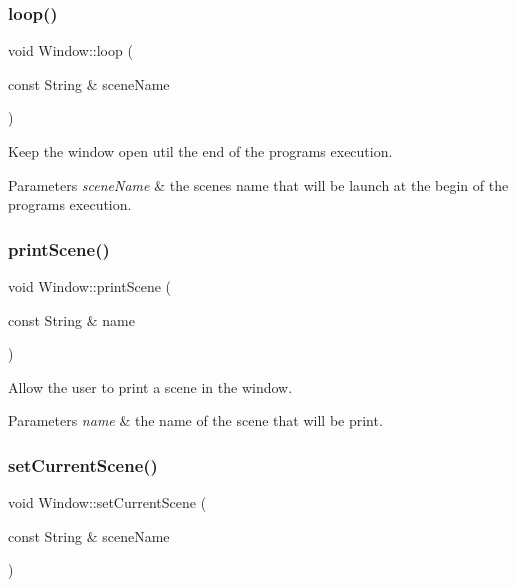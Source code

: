 \subsubsection{\texorpdfstring{loop()}{loop()}}
{\footnotesize\ttfamily void Window\+::loop (\begin{DoxyParamCaption}\item[{const String \&}]{scene\+Name }\end{DoxyParamCaption})}



Keep the window open util the end of the program\textquotesingle{}s execution. 


\begin{DoxyParams}{Parameters}
{\em \textquotesingle{}scene\+Name\textquotesingle{}} & the scene\textquotesingle{}s name that will be launch at the begin of the program\textquotesingle{}s execution. \\
\hline
\end{DoxyParams}
\mbox{\label{classWindow_a9e73c1dc8b22cdf16e6446af6f7ade48}} 
\subsubsection{\texorpdfstring{print\+Scene()}{printScene()}}
{\footnotesize\ttfamily void Window\+::print\+Scene (\begin{DoxyParamCaption}\item[{const String \&}]{name }\end{DoxyParamCaption})}



Allow the user to print a scene in the window. 


\begin{DoxyParams}{Parameters}
{\em \textquotesingle{}name\textquotesingle{}} & the name of the scene that will be print. \\
\hline
\end{DoxyParams}
\mbox{\label{classWindow_a3342dc02339a5974d5c6fcefd91d0cbf}} 
\subsubsection{\texorpdfstring{set\+Current\+Scene()}{setCurrentScene()}}
{\footnotesize\ttfamily void Window\+::set\+Current\+Scene (\begin{DoxyParamCaption}\item[{const String \&}]{scene\+Name }\end{DoxyParamCaption})}



